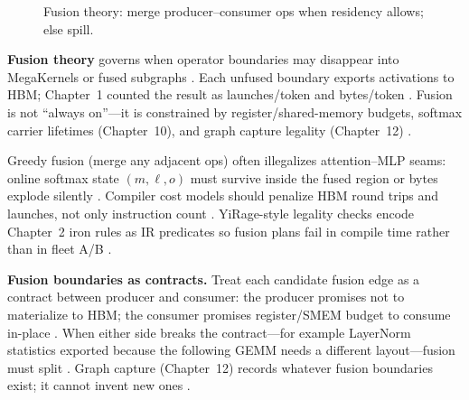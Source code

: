 \begin{figure}[t]
\centering
{}
\caption{Fusion theory: merge producer--consumer ops when residency allows; else spill.}
\label{fig:fusion_theory_architecture}
\end{figure}

\textbf{Fusion theory} governs when operator boundaries may disappear into MegaKernels or fused subgraphs \citep{yirage2026,dao2022flashattention,taxbreak2026}. Each unfused boundary exports activations to HBM; Chapter~1 counted the result as launches/token and bytes/token \citep{taxbreak2026,memoryfloor2026,patel2025llminference,kwon2023vllm}. Fusion is not ``always on''---it is constrained by register/shared-memory budgets, softmax carrier lifetimes (Chapter~10), and graph capture legality (Chapter~12) \citep{dao2022flashattention,nvidia2024cudagraphs,yirage2026,semianalysis2024tma}.

Greedy fusion (merge any adjacent ops) often illegalizes attention--MLP seams: online softmax state $(m,\ell,o)$ must survive inside the fused region or bytes explode silently \citep{dao2022flashattention,dao2023flashdecoding,memoryfloor2026}. Compiler cost models should penalize HBM round trips and launches, not only instruction count \citep{chen2020compilerbasedhardw,yirage2026,patel2025llminference,taxbreak2026}. YiRage-style legality checks encode Chapter~2 iron rules as IR predicates so fusion plans fail in compile time rather than in fleet A/B \citep{yirage2026,chen2020compilerbasedhardw,liu2024deepseekv3,amd2024aie}.

\textbf{Fusion boundaries as contracts.} Treat each candidate fusion edge as a contract between producer and consumer: the producer promises not to materialize to HBM; the consumer promises register/SMEM budget to consume in-place \citep{yirage2026,memoryfloor2026,dao2022flashattention}. When either side breaks the contract---for example LayerNorm statistics exported because the following GEMM needs a different layout---fusion must split \citep{taxbreak2026,patel2025llminference}. Graph capture (Chapter~12) records whatever fusion boundaries exist; it cannot invent new ones \citep{nvidia2024cudagraphs,memoryfloor2026}.

